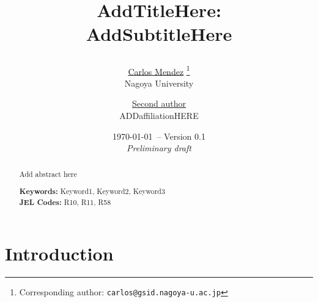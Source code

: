 \documentclass[12pt,twoside]{article}
\begin{document}

\begin{spacing}{0.9}
\begin{titlepage}

\title{
\textbf{ 
AddTitleHere: \\
}
AddSubtitleHere

}



\author{
  \large \href{https://carlos-mendez.rbind.io}{Carlos Mendez} 
  \thanks{Corresponding author: \texttt{carlos@gsid.nagoya-u.ac.jp}}
  \\
  Nagoya University
  \and
  \large \href{https://quarcs-lab.org}{Second author} 
  \\
  ADDaffiliationHERE
}

\date{\small \today \ -- Version 0.1\\ {\it Preliminary draft}}
\maketitle
\thispagestyle{empty}

\vspace{-0.3in}

\begin{abstract}
Add abstract here

\vspace{0.5cm}

\noindent \textbf{Keywords:} Keyword1, Keyword2, Keyword3 \\

\noindent  \textbf{JEL Codes:}  R10, R11, R58   

\end{abstract}

\end{titlepage}
\end{spacing}


\section{Introduction}
\end{document}
